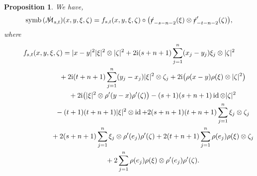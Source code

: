 \documentclass[10pt,a4paper]{amsart}
\DeclareMathOperator{\symb}{symb}
\DeclareMathOperator{\id}{id}
\newcommand{\fsl}[1]{{\slashed{#1}}} %
\numberwithin{equation}{section}
\newtheorem{prop}[theor]{Proposition}
\begin{document}
\begin{prop} \label{symb-F-s-t} We have,
\begin{gather*}
\symb\,(\fsl{\mathcal M}_{s,t})(x,y,\xi,\zeta)= f_{s,t}(x,y, \xi,\zeta) \circ \big( \fsl{r}_{-s-n-2}(\xi) \otimes \fsl{r}'_{-t-n-2}(\zeta)\big),
\end{gather*}
where
\begin{gather*}
f_{s,t}(x,y,\xi,\zeta) = \vert x-y\vert^2 \vert \xi\vert^2 \otimes \vert \zeta\vert^2
 +2{\rm i}(s+n+1) \sum_{j=1}^n (x_j-y_j)\xi_j\otimes \vert \zeta\vert^2
 \\ \hphantom{f_{s,t}(x,y,\xi,\zeta)=}
{} +2{\rm i}(t+n+1) \sum_{j=1}^n (y_j-x_j) \vert \xi\vert^2 \otimes \zeta_j
 +2{\rm i} \big(\rho(x-y)\rho(\xi)\otimes \vert \zeta\vert^2\big)
 \\ \hphantom{f_{s,t}(x,y,\xi,\zeta)=}
 {}+2{\rm i} \big(\vert \xi\vert^2 \otimes \rho'(y-x)\rho'(\zeta)\big)
 -(s+1)(s+n+1) \id\otimes \vert \zeta\vert^2
 \\ \hphantom{f_{s,t}(x,y,\xi,\zeta)=}
{} -(t+1)(t+n+1) \vert \xi\vert^2 \otimes \id
 +2(s+n+1)(t+n+1) \sum_{j=1}^n \xi_j\otimes \zeta_j
 \\ \hphantom{f_{s,t}(x,y,\xi,\zeta)=}
{} +2(s+n+1) \sum_{j=1}^n \xi_j\otimes \rho'(e_j)\rho'(\zeta)
+2(t+n+1)\sum_{j=1}^n \rho(e_j)\rho(\xi)\otimes \zeta_j
\\ \hphantom{f_{s,t}(x,y,\xi,\zeta)=}
{} +2\sum_{j=1}^n \rho(e_j)\rho(\xi)\otimes \rho'(e_j)\rho'(\zeta) .
\end{gather*}
\end{prop}
\end{document}
